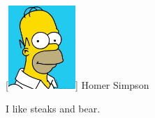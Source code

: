 \begin{IEEEbiography}
	[{\includegraphics[width=1in,height=1.25in,clip,keepaspectratio]{./biographies/homer_simpson.jpg}}]	
	{Homer Simpson}
	
	I like steaks and bear.
	
\end{IEEEbiography}